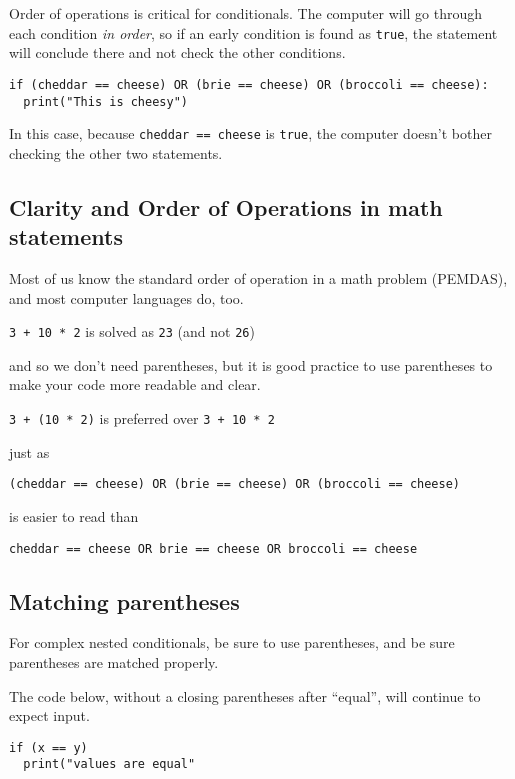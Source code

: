 \documentclass[
]{book}
\begin{document}
Order of operations is critical for conditionals. The computer will go through each condition \emph{in order}, so if an early condition is found as \texttt{true}, the statement will conclude there and not check the other conditions.

\begin{verbatim}
if (cheddar == cheese) OR (brie == cheese) OR (broccoli == cheese):
  print("This is cheesy")
\end{verbatim}

In this case, because \texttt{cheddar\ ==\ cheese} is \texttt{true}, the computer doesn't bother checking the other two statements.

\subsection{Clarity and Order of Operations in math statements}\label{clarity-and-order-of-operations-in-math-statements}

Most of us know the standard order of operation in a math problem (PEMDAS), and most computer languages do, too.

\texttt{3\ +\ 10\ *\ 2} is solved as \texttt{23} (and not \texttt{26})

and so we don't need parentheses, but it is good practice to use parentheses to make your code more readable and clear.

\texttt{3\ +\ (10\ *\ 2)} is preferred over \texttt{3\ +\ 10\ *\ 2}

just as

\texttt{(cheddar\ ==\ cheese)\ OR\ (brie\ ==\ cheese)\ OR\ (broccoli\ ==\ cheese)}

is easier to read than

\texttt{cheddar\ ==\ cheese\ OR\ brie\ ==\ cheese\ OR\ broccoli\ ==\ cheese}

\subsection{Matching parentheses}\label{matching-parentheses}

For complex nested conditionals, be sure to use parentheses, and be sure parentheses are matched properly.

The code below, without a closing parentheses after ``equal'', will continue to expect input.

\begin{verbatim}
if (x == y) 
  print("values are equal"
\end{verbatim}
\end{document}
